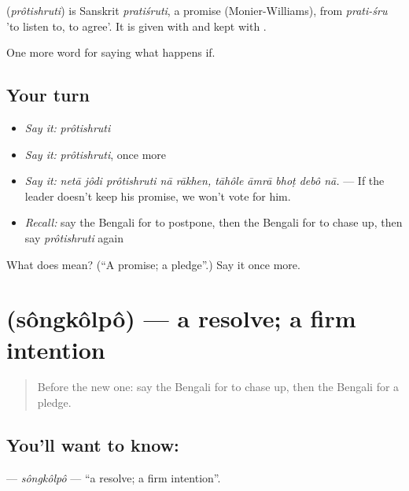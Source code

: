 \begin{cousinweb}
\textbf{} (\emph{prôtishruti}) is Sanskrit \emph{pratiśruti}, a promise (Monier-Williams), from \emph{prati-śru} 'to listen to, to agree'. It is given with  and kept with .
\end{cousinweb}

\begin{grammarlens}[title={What you've built}]
One more word for saying what happens if.
\end{grammarlens}

\subsection*{Your turn}
\begin{itemize}
\raggedright
  \item \emph{Say it:} \emph{prôtishruti}
  \item \emph{Say it:} \emph{prôtishruti}, once more
  \item \emph{Say it:} \emph{netā jôdi prôtishruti nā rākhen, tāhôle āmrā bhoṭ debô nā.} — If the leader doesn't keep his promise, we won't vote for him.
  \item \emph{Recall:} say the Bengali for to postpone, then the Bengali for to chase up, then say \emph{prôtishruti} again
\end{itemize}

\begin{tcolorbox}[breakable,colback=teal!4,colframe=teal!35!black,title={Before you move on}]
What does  mean? (\textquotedblleft{}A promise; a pledge\textquotedblright{}.) Say it once more.
\end{tcolorbox}
\section[\texorpdfstring{\bn{সংকল্প} (sôngkôlpô)}{সংকল্প (sôngkôlpô)}]{ (sôngkôlpô) — a resolve; a firm intention}

\label{lesson:BN-C379-songkolpo}



\begin{quote}
Before the new one: say the Bengali for to chase up, then the Bengali for a pledge.
\end{quote}

\subsection*{You'll want to know: }
\textbf{} — \emph{sôngkôlpô} — \textquotedblleft{}a resolve; a firm intention\textquotedblright{}.

